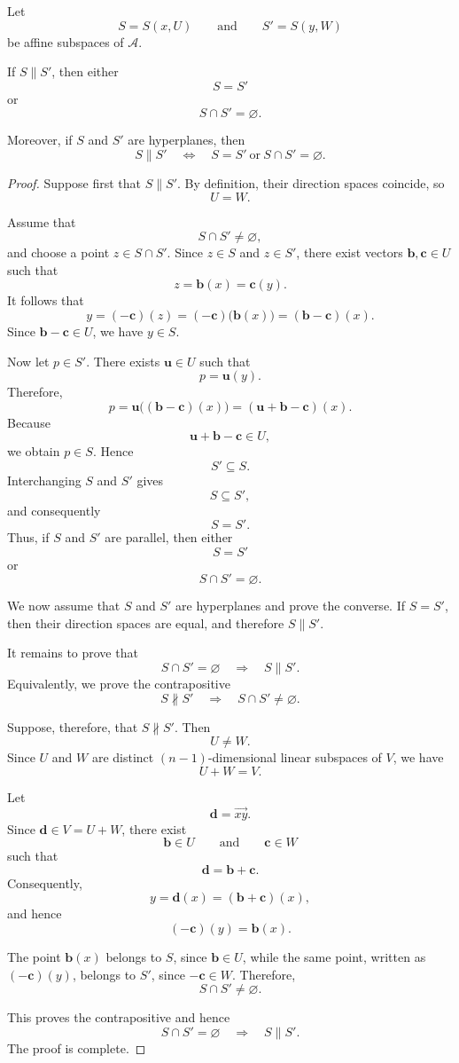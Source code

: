 \documentclass[12pt]{article}
\begin{document}
\begin{proposition}
Let
\[
S=S(x,U)
\qquad\text{and}\qquad
S'=S(y,W)
\]
be affine subspaces of \(\mathcal A\).

If \(S\parallel S'\), then either
\[
S=S'
\]
or
\[
S\cap S'=\varnothing.
\]

Moreover, if \(S\) and \(S'\) are hyperplanes, then
\[
S\parallel S'
\quad\Longleftrightarrow\quad
S=S'
\ \text{or}\
S\cap S'=\varnothing.
\]
\end{proposition}

\begin{proof}
Suppose first that \(S\parallel S'\). By definition, their direction
spaces coincide, so
\[
U=W.
\]

Assume that
\[
S\cap S'\neq\varnothing,
\]
and choose a point \(z\in S\cap S'\). Since \(z\in S\) and
\(z\in S'\), there exist vectors \(\mathbf b,\mathbf c\in U\) such
that
\[
z=\mathbf b(x)=\mathbf c(y).
\]
It follows that
\[
y=(-\mathbf c)(z)
  =(-\mathbf c)\bigl(\mathbf b(x)\bigr)
  =(\mathbf b-\mathbf c)(x).
\]
Since \(\mathbf b-\mathbf c\in U\), we have \(y\in S\).

Now let \(p\in S'\). There exists \(\mathbf u\in U\) such that
\[
p=\mathbf u(y).
\]
Therefore,
\[
p
 =\mathbf u\bigl((\mathbf b-\mathbf c)(x)\bigr)
 =(\mathbf u+\mathbf b-\mathbf c)(x).
\]
Because
\[
\mathbf u+\mathbf b-\mathbf c\in U,
\]
we obtain \(p\in S\). Hence
\[
S'\subseteq S.
\]
Interchanging \(S\) and \(S'\) gives
\[
S\subseteq S',
\]
and consequently
\[
S=S'.
\]
Thus, if \(S\) and \(S'\) are parallel, then either
\[
S=S'
\]
or
\[
S\cap S'=\varnothing.
\]

We now assume that \(S\) and \(S'\) are hyperplanes and prove the
converse. If \(S=S'\), then their direction spaces are equal, and
therefore \(S\parallel S'\).

It remains to prove that
\[
S\cap S'=\varnothing
\quad\Longrightarrow\quad
S\parallel S'.
\]
Equivalently, we prove the contrapositive
\[
S\not\parallel S'
\quad\Longrightarrow\quad
S\cap S'\neq\varnothing.
\]

Suppose, therefore, that \(S\not\parallel S'\). Then
\[
U\neq W.
\]
Since \(U\) and \(W\) are distinct \((n-1)\)-dimensional linear
subspaces of \(V\), we have
\[
U+W=V.
\]

Let
\[
\mathbf d=\overrightarrow{xy}.
\]
Since \(\mathbf d\in V=U+W\), there exist
\[
\mathbf b\in U
\qquad\text{and}\qquad
\mathbf c\in W
\]
such that
\[
\mathbf d=\mathbf b+\mathbf c.
\]
Consequently,
\[
y=\mathbf d(x)=(\mathbf b+\mathbf c)(x),
\]
and hence
\[
(-\mathbf c)(y)=\mathbf b(x). 
\]

The point \(\mathbf b(x)\) belongs to \(S\), since \(\mathbf b\in U\),
while the same point, written as \((-\mathbf c)(y)\), belongs to
\(S'\), since \(-\mathbf c\in W\). Therefore,
\[
S\cap S'\neq\varnothing.
\]

This proves the contrapositive and hence
\[
S\cap S'=\varnothing
\quad\Longrightarrow\quad
S\parallel S'.
\]
The proof is complete.
\end{proof}
\end{document}
